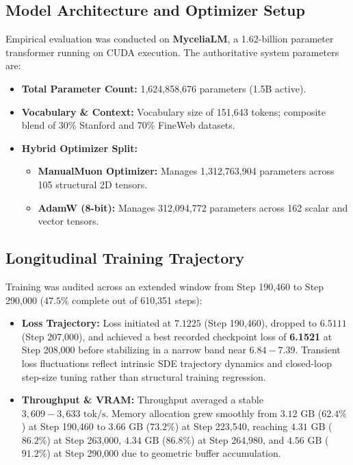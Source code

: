 \documentclass[11pt]{article}
\begin{document}
\subsection{Model Architecture and Optimizer Setup}
Empirical evaluation was conducted on \textbf{MyceliaLM}, a 1.62-billion parameter transformer running on CUDA execution. The authoritative system parameters are:
\begin{itemize}
    \item \textbf{Total Parameter Count:} 1,624,858,676 parameters (1.5B active).
    \item \textbf{Vocabulary \& Context:} Vocabulary size of 151,643 tokens; composite blend of 30\% Stanford and 70\% FineWeb datasets.
    \item \textbf{Hybrid Optimizer Split:}
    \begin{itemize}
        \item \textbf{ManualMuon Optimizer:} Manages 1,312,763,904 parameters across 105 structural 2D tensors.
        \item \textbf{AdamW (8-bit):} Manages 312,094,772 parameters across 162 scalar and vector tensors.
    \end{itemize}
\end{itemize}

\subsection{Longitudinal Training Trajectory}
Training was audited across an extended window from Step 190,460 to Step 290,000 ($47.5\%$ complete out of 610,351 steps):
\begin{itemize}
    \item \textbf{Loss Trajectory:} Loss initiated at $7.1225$ (Step 190,460), dropped to $6.5111$ (Step 207,000), and achieved a best recorded checkpoint loss of \textbf{6.1521} at Step 208,000 before stabilizing in a narrow band near $6.84 - 7.39$. Transient loss fluctuations reflect intrinsic SDE trajectory dynamics and closed-loop step-size tuning rather than structural training regression.
    \item \textbf{Throughput \& VRAM:} Throughput averaged a stable $3,609 - 3,633 \text{ tok/s}$. Memory allocation grew smoothly from $3.12 \text{ GB}$ ($62.4\%$) at Step 190,460 to $3.66 \text{ GB}$ ($73.2\%$) at Step 223,540, reaching $4.31 \text{ GB}$ ($86.2\%$) at Step 263,000, $4.34 \text{ GB}$ ($86.8\%$) at Step 264,980, and $4.56 \text{ GB}$ ($91.2\%$) at Step 290,000 due to geometric buffer accumulation.
\end{itemize}
\end{document}
